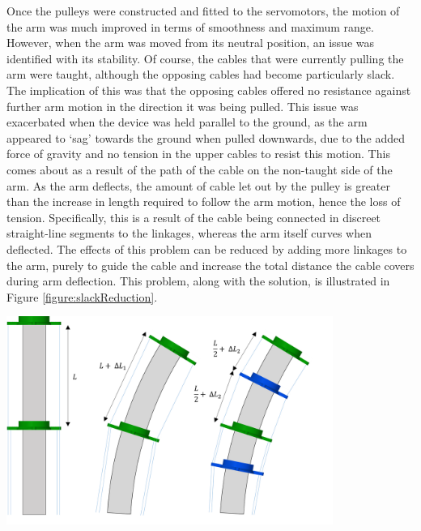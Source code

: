 \documentclass[11pt]{article}
\begin{document}
Once the pulleys were constructed and fitted to the servomotors, the motion of the arm was much improved in terms of smoothness and maximum range. However, when the arm was moved from its neutral position, an issue was identified with its stability. Of course, the cables that were currently pulling the arm were taught, although the opposing cables had become particularly slack. The implication of this was that the opposing cables offered no resistance against further arm motion in the direction it was being pulled. This issue was exacerbated when the device was held parallel to the ground, as the arm appeared to `sag' towards the ground when pulled downwards, due to the added force of gravity and no tension in the upper cables to resist this motion. This comes about as a result of the path of the cable on the non-taught side of the arm. As the arm deflects, the amount of cable let out by the pulley is greater than the increase in length required to follow the arm motion, hence the loss of tension. Specifically, this is a result of the cable being connected in discreet straight-line segments to the linkages, whereas the arm itself curves when deflected. The effects of this problem can be reduced by adding more linkages to the arm, purely to guide the cable and increase the total distance the cable covers during arm deflection. This problem, along with the solution, is illustrated in Figure \ref{figure:slackReduction}.


\begin{center}
\includegraphics[width=0.8\textwidth]{images/slackReduction.png}
\label{figure:slackReduction}
\end{center}
\end{document}
